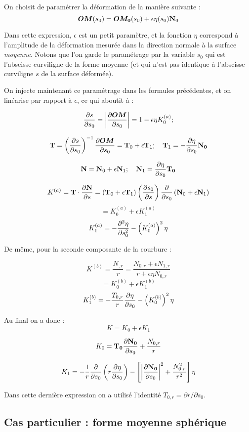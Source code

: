 On choisit de paramétrer la déformation de la manière suivante :
$$
\vec{OM}(s_0)  = \vec{OM_0}(s_0) + \epsilon \eta(s_0) {\bf N}_0
$$

Dans cette expression, $\epsilon$ est un petit paramètre, et la fonction $\eta$ correspond à l'amplitude de la déformation mesurée dans la direction normale à la surface {\em moyenne}. Notons 
que l'on garde le paramétrage par la variable $s_0$ qui est l'abscisse curviligne de la forme moyenne 
(et qui n'est pas identique à l'abscisse curviligne $s$ de la surface déformée).

On injecte maintenant ce paramétrage dans les formules précédentes, et on linéarise par rapport à 
$\epsilon$, ce qui aboutit à : 


$$
\DP{s}{s_0} = \left| \DP{\vec{OM}}{s_0} \right| = 1 - \epsilon \eta K_0^{(a)} ;
$$

$$
{\bf T} = \left(\DP{s}{s_0}\right)^{-1} \DP{\vec{OM}}{s_0} = {\bf T}_0 +  \epsilon  {\bf T}_1 ; \quad 
{\bf T}_1 = - \DP{\eta}{s_0}{\bf N_0}
$$

$$
{\bf N} = {\bf N}_0 +  \epsilon  {\bf N}_1 ; \quad 
{\bf N}_1 = \frac{\partial \eta}{\partial s_0}{\bf T_0}
$$

$$
K^{(a)} = {\bf T} \cdot \frac{\partial {\bf N}}{\partial s} =  
\left( {\bf T}_0 +  \epsilon  {\bf T}_1 \right) \left( \frac{\partial s_0}{\partial s} \right) 
 \frac{\partial }{\partial s_0}  \left({\bf N}_0 +  \epsilon  {\bf N}_1 \right)
$$
$$
= K^{(a)}_0 + \epsilon K^{(a)}_1
$$
$$
K^{(a)}_1 = 
-\frac{\partial ^2 \eta }{\partial s_0^2} - \left( K^{(a)}_0 \right)^2 \eta 
$$ 


De même, pour la seconde composante de la courbure : 

$$
K^{(b)} = \frac{ N_{,r}}{r} = \frac{ N_{0,r} + \epsilon N_{1,r}}{r + \epsilon \eta N_{0,r}}
$$
$$
= 
K^{(b)}_0 + \epsilon K^{(b)}_1
$$
$$
K^{(b)}_1 = - \frac{T_{0,r}}{r} \frac{\partial \eta}{\partial s_0} -  \left( K^{(b)}_0 \right)^2 \eta 
$$

Au final on a donc :
$$
K = K_0 + \epsilon K_1
$$

$$
K_0   = {\bf T_0} \frac{\partial \bf N_0}{\partial s_0}  + \frac{N_{0,r}}{r}
$$

$$
K_1   = - \frac{1}{r} \frac{\partial }{\partial s_0} \left( r \frac{\partial \eta}{\partial s_0} \right) -
\left[ \left| \frac{\partial \bf N_0}{\partial s_0} \right|^2  + \frac{N_{0,r}^2}{r^2} \right] \eta
$$

Dans cette dernière expression on a utilisé l'identité $T_{0,r} = \partial r / \partial s_0$.

\subsection{Cas particulier : forme moyenne sphérique}

